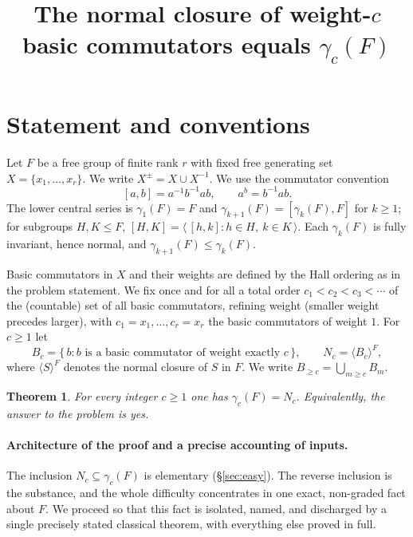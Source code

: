 \documentclass{amsart}
\newtheorem{theorem}{Theorem}
\theoremstyle{definition}
\theoremstyle{remark}
\begin{document}
\title{The normal closure of weight-$c$ basic commutators equals $\gamma_c(F)$}
\maketitle

\section{Statement and conventions}

Let $F$ be a free group of finite rank $r$ with fixed free generating set
$X=\{x_1,\dots,x_r\}$. We write $X^{\pm}=X\cup X^{-1}$. We use the commutator
convention
\[
[a,b]=a^{-1}b^{-1}ab ,\qquad a^{b}=b^{-1}ab .
\]
The lower central series is $\gamma_1(F)=F$ and $\gamma_{k+1}(F)=[\gamma_k(F),F]$
for $k\ge 1$; for subgroups $H,K\le F$,
$[H,K]=\langle\, [h,k] : h\in H,\ k\in K \,\rangle$.
Each $\gamma_k(F)$ is fully invariant, hence normal, and
$\gamma_{k+1}(F)\le\gamma_k(F)$.

Basic commutators in $X$ and their weights are defined by the Hall ordering as in
the problem statement. We fix once and for all a total order
$c_1<c_2<c_3<\cdots$ of the (countable) set of all basic commutators, refining
weight (smaller weight precedes larger), with $c_1=x_1,\dots,c_r=x_r$ the basic
commutators of weight $1$. For $c\ge 1$ let
\[
B_c=\{\,b : b \text{ is a basic commutator of weight exactly } c\,\},
\qquad
N_c=\langle B_c\rangle^{F},
\]
where $\langle S\rangle^{F}$ denotes the normal closure of $S$ in $F$. We write
$B_{\ge c}=\bigcup_{m\ge c}B_m$.

\begin{theorem}\label{thm:main}
For every integer $c\ge 1$ one has $\gamma_c(F)=N_c$. Equivalently, the answer to
the problem is \emph{yes}.
\end{theorem}

\paragraph{Architecture of the proof and a precise accounting of inputs.}
The inclusion $N_c\subseteq\gamma_c(F)$ is elementary (\S\ref{sec:easy}). The
reverse inclusion is the substance, and the whole difficulty concentrates in one
exact, non-graded fact about $F$. We proceed so that this fact is isolated, named,
and discharged by a single precisely stated classical theorem, with everything else
proved in full.
\end{document}
